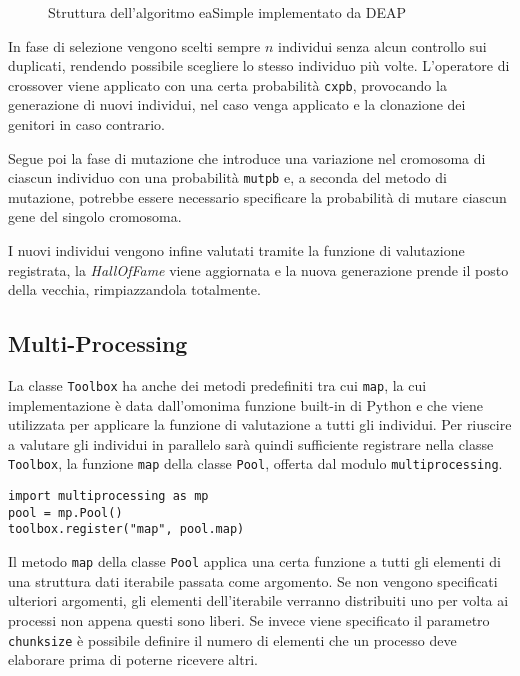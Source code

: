 \begin{figure}[H]
	\centering
	
	\caption{Struttura dell'algoritmo eaSimple implementato da DEAP}
	\label{fig: deap_ga}
\end{figure}

In fase di selezione vengono scelti sempre $n$ individui senza alcun controllo
sui duplicati, rendendo possibile scegliere lo stesso individuo più volte.
L'operatore di crossover viene applicato con una certa probabilità \verb|cxpb|,
provocando la generazione di nuovi individui, nel caso venga applicato e la
clonazione dei genitori in caso contrario.

Segue poi la fase di mutazione che introduce una variazione nel cromosoma di
ciascun individuo con una probabilità \verb|mutpb| e, a seconda del metodo di
mutazione, potrebbe essere necessario specificare la probabilità di mutare
ciascun gene del singolo cromosoma.

I nuovi individui vengono infine valutati tramite la funzione di valutazione
registrata, la \textit{HallOfFame} viene aggiornata e la nuova generazione
prende il posto della vecchia, rimpiazzandola totalmente.

\subsection*{Multi-Processing}

La classe \verb|Toolbox| ha anche dei metodi predefiniti tra cui \verb|map|, la
cui implementazione è data dall'omonima funzione built-in di Python e che viene
utilizzata per applicare la funzione di valutazione a tutti gli individui. Per
riuscire a valutare gli individui in parallelo sarà quindi sufficiente
registrare nella classe \verb|Toolbox|, la funzione \verb|map| della classe
\verb|Pool|, offerta dal modulo \verb|multiprocessing|.

\begin{lstlisting}[caption={DEAP Multiprocessing}]
import multiprocessing as mp
pool = mp.Pool()
toolbox.register("map", pool.map)
\end{lstlisting}

Il metodo \verb|map| della classe \verb|Pool| applica una certa funzione a
tutti gli elementi di una struttura dati iterabile passata come argomento. Se
non vengono specificati ulteriori argomenti, gli elementi dell'iterabile
verranno distribuiti uno per volta ai processi non appena questi sono liberi.
Se invece viene specificato il parametro \verb|chunksize| è possibile definire
il numero di elementi che un processo deve elaborare prima di poterne ricevere
altri.

